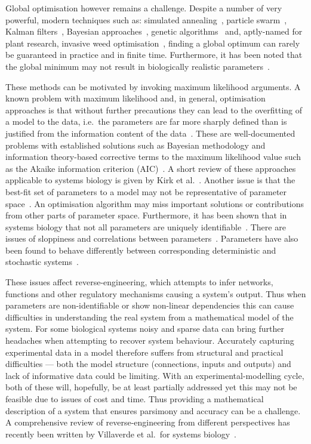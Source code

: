 Global optimisation however remains a challenge.
Despite a number of very powerful, modern techniques such as: simulated annealing~\cite{kirkpatrick1983}, particle swarm~\cite{schwaab2008}, Kalman filters~\cite{lillacci2010, quach2007}, Bayesian approaches~\cite{toni2009,granqvist2011}, genetic algorithms~\cite{forrest1993} and, aptly-named for plant research, invasive weed optimisation~\cite{mehrabian2006}, finding a global optimum can rarely be guaranteed in practice and in finite time.
Furthermore, it has been noted that the global minimum may not result in biologically realistic parameters~\cite{slezak2010}.

These methods can be motivated by invoking maximum likelihood arguments.
A known problem with maximum likelihood and, in general, optimisation approaches is that without further precautions they can lead to the overfitting of a model to the data, i.e.~the parameters are far more sharply defined than is justified from the information content of the data~\cite{hawkins2004}.
These are well-documented problems with established solutions such as Bayesian methodology and information theory-based corrective terms to the maximum likelihood value such as the Akaike information criterion (AIC)~\cite{akaike1973,akaike1974}.
A short review of these approaches applicable to systems biology is given by Kirk et al.~\cite{kirk2013}.
Another issue is that the best-fit set of parameters to a model may not be representative of parameter space~\cite{mackay2003}.
An optimisation algorithm may miss important solutions or contributions from other parts of parameter space.
Furthermore, it has been shown that in systems biology that not all parameters are uniquely identifiable~\cite{erguler2011}.
There are issues of sloppiness and correlations between parameters~\cite{gutenkunst2007,erguler2011}.
Parameters have also been found to behave differently between corresponding deterministic and stochastic systems~\cite{komorowski2011}.

These issues affect reverse-engineering, which attempts to infer networks, functions and other regulatory mechanisms causing a system's output.
Thus when parameters are non-identifiable or show non-linear dependencies this can cause difficulties in understanding the real system from a mathematical model of the system.
For some biological systems noisy and sparse data can bring further headaches when attempting to recover system behaviour.
Accurately capturing experimental data in a model therefore suffers from structural and practical difficulties --- both the model structure (connections, inputs and outputs) and lack of informative data could be limiting.
With an experimental-modelling cycle, both of these will, hopefully, be at least partially addressed yet this may not be feasible due to issues of cost and time.
Thus providing a mathematical description of a system that ensures parsimony and accuracy can be a challenge.
A comprehensive review of reverse-engineering from different perspectives has recently been written by Villaverde et al.\ for systems biology~\cite{villaverde2014}.

